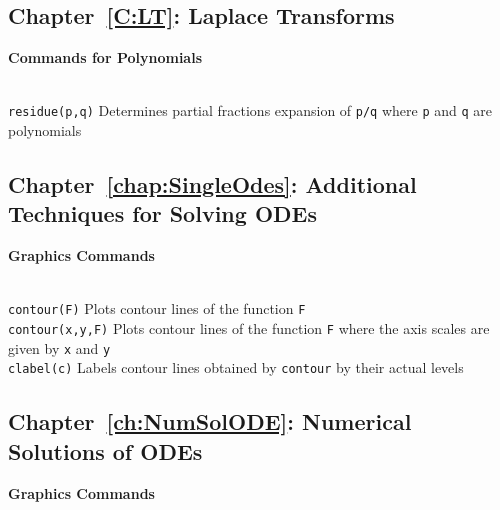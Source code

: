 \documentclass{ximera}
\begin{document}
\subsection*{Chapter~\ref{C:LT}: Laplace Transforms}


\centerline{
{\bf Commands for Polynomials}
} \vspace*{-0.1in}
 
\begin{tabbing}
 \hspace{1.1in} \= \\

     {\tt residue(p,q)}   \> 
 Determines partial fractions expansion of
		{\tt p/q} where {\tt p} and {\tt q} are polynomials 
 
\end{tabbing}



\subsection*{Chapter~\ref{chap:SingleOdes}: Additional Techniques for Solving ODEs}



\centerline{
{\bf Graphics Commands}
} \vspace*{-0.1in}
 
\begin{tabbing}
 \hspace{1.2in} \= \\

     {\tt contour(F)}   \>
 Plots contour lines of the function {\tt F} \\
 
     {\tt contour(x,y,F)}   \>
 Plots contour lines of the function {\tt F}
	where the axis scales are given by {\tt x} and {\tt y} \\

     {\tt clabel(c)}   \>
 Labels contour lines obtained by {\tt contour}
	by their actual levels
 


\end{tabbing}

\subsection*{Chapter~\ref{ch:NumSolODE}: Numerical Solutions of ODEs}
 
\centerline{
{\bf Graphics Commands}
} \vspace*{-0.1in}
 
\end{document}
